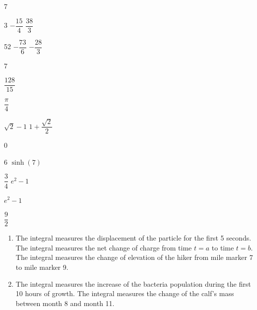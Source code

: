 \documentclass{book}
\begin{document}
\begin{appendices}
\begin{enumerate}[!HW!]
\begin{multicols}{7}
\item 3
\itemspade $-\dfrac{15}{4}$
\itemspade $\dfrac{38}{3}$
\item 52
\itemspade $-\dfrac{73}{6}$
\itemspade $-\dfrac{28}{3}$
\end{multicols}
\begin{multicols}{7}
\item $\dfrac{128}{15}$
\item $\dfrac{\pi}{4}$
\item $\sqrt{2}-1$
\itemspade $1+\dfrac{\sqrt{2}}{2}$
\item 0
\end{multicols}
\begin{multicols}{6}
\itemspade $\sinh(7)$
\item $\dfrac{3}{4}$
\itemspade $e^2-1$
\item $e^2-1$
\item $\dfrac{9}{2}$
\end{multicols}
\end{enumerate}
\vspace{-15pt}

\begin{enumerate}[!HW!]
\item The integral measures the displacement of the particle for the first 5 seconds.
\itemspade The integral measures the net change of charge from time $t=a$ to time $t=b$.
\itemspade The integral measures the change of elevation of the hiker from mile marker 7 to mile marker 9.
\item The integral measures the increase of the bacteria population during the first 10 hours of growth.
\itemspade The integral measures the change of the calf's mass between month 8 and month 11.
\end{enumerate}\vspace{-15pt}


\end{appendices}
\end{document}
